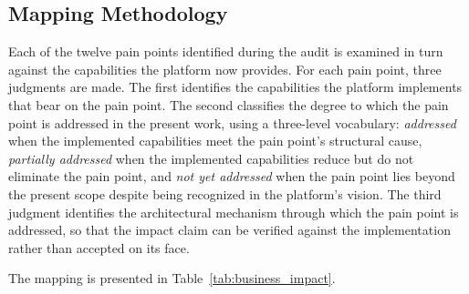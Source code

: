 \subsection*{Mapping Methodology}
Each of the twelve pain points identified during the audit is examined in turn against the capabilities the platform now provides. For each pain point, three judgments are made. The first identifies the capabilities the platform implements that bear on the pain point. The second classifies the degree to which the pain point is addressed in the present work, using a three-level vocabulary: \textit{addressed} when the implemented capabilities meet the pain point's structural cause, \textit{partially addressed} when the implemented capabilities reduce but do not eliminate the pain point, and \textit{not yet addressed} when the pain point lies beyond the present scope despite being recognized in the platform's vision. The third judgment identifies the architectural mechanism through which the pain point is addressed, so that the impact claim can be verified against the implementation rather than accepted on its face.

The mapping is presented in Table~\ref{tab:business_impact}.

